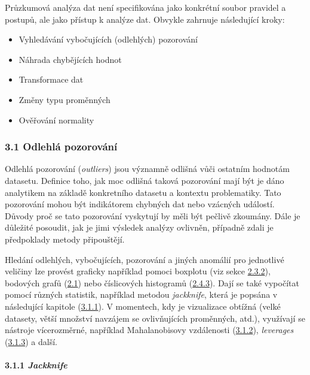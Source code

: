 \documentclass[12pt,]{article}
\providecommand{\tightlist}{%
  \setlength{\itemsep}{0pt}\setlength{\parskip}{0pt}}
\let\oldparagraph\paragraph
\renewcommand{\paragraph}[1]{\oldparagraph{#1}\mbox{}}
\begin{document}
\qquad Průzkumová analýza dat není specifikována jako konkrétní soubor
pravidel a postupů, ale jako přístup k analýze dat. Obvykle zahrnuje
následující kroky:

\begin{itemize}
\tightlist
\item
  Vyhledávání vybočujících (odlehlých) pozorování
\item
  Náhrada chybějících hodnot
\item
  Transformace dat
\item
  Změny typu proměnných
\item
  Ověřování normality
\end{itemize}

\subsubsection{3.1 Odlehlá pozorování}\label{odlehla-pozorovani}

\qquad Odlehlá pozorování (\emph{outliers}) jsou významně odlišná vůči
ostatním hodnotám datasetu. Definice toho, jak moc odlišná taková
pozorování mají být je dáno analytikem na základě konkretního datasetu a
kontextu problematiky. Tato pozorování mohou být indikátorem chybných
dat nebo vzácných událostí. Důvody proč se tato pozorování vyskytují by
měli být pečlivě zkoumány. Dále je důležité posoudit, jak je jimi
výsledek analýzy ovlivněn, případně zdali je předpoklady metody
připouštějí.

\qquad Hledání odlehlých, vybočujících, pozorování a jiných anomálií pro
jednotlivé veličiny lze provést graficky například pomoci boxplotu (viz
sekce \protect\hyperlink{boxplot}{2.3.2}), bodových grafů
(\protect\hyperlink{scatterplot}{2.1}) nebo číslicových histogramů
(\protect\hyperlink{stem-and-leaf}{2.4.3}). Dají se také vypočítat
pomocí různých statistik, například metodou \emph{jackknife}, která je
popsána v následující kapitole (\protect\hyperlink{jackknife}{3.1.1}). V
momentech, kdy je vizualizace obtížná (velké datasety, větší množství
navzájem se ovlivňujících proměnných, atd.), využívají se nástroje
vícerozměrné, například Mahalanobisovy vzdálenosti
(\protect\hyperlink{mbdist}{3.1.2}), \emph{leverages}
(\protect\hyperlink{leverages}{3.1.3}) a další.

\hypertarget{jackknife}{\paragraph{\texorpdfstring{3.1.1
\emph{Jackknife}}{3.1.1 Jackknife}}\label{jackknife}}
\end{document}
